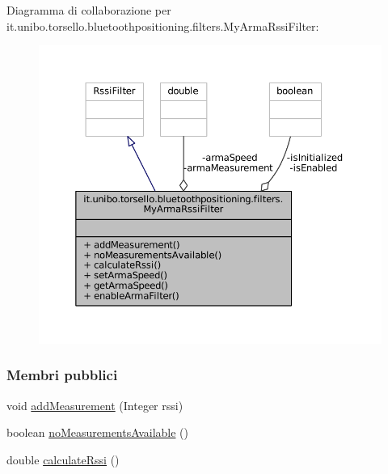 Diagramma di collaborazione per it.\+unibo.\+torsello.\+bluetoothpositioning.\+filters.\+My\+Arma\+Rssi\+Filter\+:
\nopagebreak
\begin{figure}[H]
\begin{center}
\leavevmode
\includegraphics[width=350pt]{classit_1_1unibo_1_1torsello_1_1bluetoothpositioning_1_1filters_1_1MyArmaRssiFilter__coll__graph}
\end{center}
\end{figure}
\subsubsection*{Membri pubblici}
\begin{DoxyCompactItemize}
\item 
void \hyperlink{classit_1_1unibo_1_1torsello_1_1bluetoothpositioning_1_1filters_1_1MyArmaRssiFilter_afdb5386fe2b25ac048a992fb70de2f65_afdb5386fe2b25ac048a992fb70de2f65}{add\+Measurement} (Integer rssi)
\item 
boolean \hyperlink{classit_1_1unibo_1_1torsello_1_1bluetoothpositioning_1_1filters_1_1MyArmaRssiFilter_aa193a557e770f602ed998c4eacea2b41_aa193a557e770f602ed998c4eacea2b41}{no\+Measurements\+Available} ()
\item 
double \hyperlink{classit_1_1unibo_1_1torsello_1_1bluetoothpositioning_1_1filters_1_1MyArmaRssiFilter_a6414fddd8e0ae858df58b900a58bcc6f_a6414fddd8e0ae858df58b900a58bcc6f}{calculate\+Rssi} ()
\end{DoxyCompactItemize}
